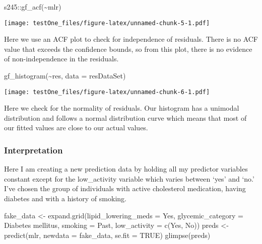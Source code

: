 \documentclass[
]{article}
\newenvironment{Shaded}{\begin{snugshade}}{\end{snugshade}}
\newcommand{\AttributeTok}[1]{\textcolor[rgb]{0.77,0.63,0.00}{#1}}
\newcommand{\ConstantTok}[1]{\textcolor[rgb]{0.00,0.00,0.00}{#1}}
\newcommand{\FunctionTok}[1]{\textcolor[rgb]{0.00,0.00,0.00}{#1}}
\newcommand{\NormalTok}[1]{#1}
\newcommand{\OtherTok}[1]{\textcolor[rgb]{0.56,0.35,0.01}{#1}}
\newcommand{\SpecialCharTok}[1]{\textcolor[rgb]{0.00,0.00,0.00}{#1}}
\newcommand{\StringTok}[1]{\textcolor[rgb]{0.31,0.60,0.02}{#1}}
\begin{document}
\begin{Shaded}
\begin{Highlighting}[]
\NormalTok{s245}\SpecialCharTok{::}\FunctionTok{gf\_acf}\NormalTok{(}\SpecialCharTok{\textasciitilde{}}\NormalTok{mlr)}
\end{Highlighting}
\end{Shaded}

\texttt{[image: testOne\_files/figure-latex/unnamed-chunk-5-1.pdf]}

Here we use an ACF plot to check for independence of residuals. There is
no ACF value that exceeds the confidence bounds, so from this plot,
there is no evidence of non-independence in the residuals.

\begin{Shaded}
\begin{Highlighting}[]
\FunctionTok{gf\_histogram}\NormalTok{(}\SpecialCharTok{\textasciitilde{}}\NormalTok{res, }\AttributeTok{data =}\NormalTok{ resDataSet)}
\end{Highlighting}
\end{Shaded}

\texttt{[image: testOne\_files/figure-latex/unnamed-chunk-6-1.pdf]}

Here we check for the normality of residuals. Our histogram has a
unimodal distribution and follows a normal distribution curve which
means that most of our fitted values are close to our actual values.

\hypertarget{interpretation}{%
\subsubsection{Interpretation}\label{interpretation}}

Here I am creating a new prediction data by holding all my predictor
variables constant except for the low\_activity variable which varies
between `yes' and `no.' I've chosen the group of individuals with active
cholesterol medication, having diabetes and with a history of smoking.

\begin{Shaded}
\begin{Highlighting}[]
\NormalTok{fake\_data }\OtherTok{\textless{}{-}} \FunctionTok{expand.grid}\NormalTok{(}\AttributeTok{lipid\_lowering\_meds =} \StringTok{\textquotesingle{}Yes\textquotesingle{}}\NormalTok{,}
                         \AttributeTok{glycemic\_category =} \StringTok{\textquotesingle{}Diabetes mellitus\textquotesingle{}}\NormalTok{,}
                         \AttributeTok{smoking =} \StringTok{\textquotesingle{}Past\textquotesingle{}}\NormalTok{,}
                         \AttributeTok{low\_activity =} \FunctionTok{c}\NormalTok{(}\StringTok{\textquotesingle{}Yes\textquotesingle{}}\NormalTok{, }\StringTok{\textquotesingle{}No\textquotesingle{}}\NormalTok{))}
\NormalTok{preds }\OtherTok{\textless{}{-}} \FunctionTok{predict}\NormalTok{(mlr,}
                 \AttributeTok{newdata =}\NormalTok{ fake\_data,}
                 \AttributeTok{se.fit =} \ConstantTok{TRUE}\NormalTok{)}
\FunctionTok{glimpse}\NormalTok{(preds)}
\end{Highlighting}
\end{Shaded}
\end{document}
